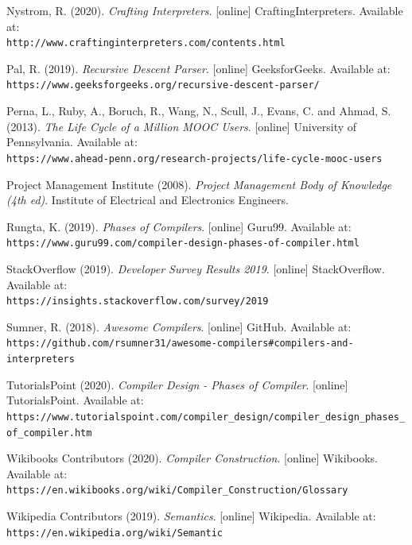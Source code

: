\documentclass[
]{report}
\begin{document}
\begin{thebibliography}{24}
	Nystrom, R. (2020).
	\textit{Crafting Interpreters}.
	[online] CraftingInterpreters. Available at:
	\\\texttt{http://www.craftinginterpreters.com/contents.html}
	
	Pal, R. (2019).
	\textit{Recursive Descent Parser}.
	[online] GeeksforGeeks. Available at:
	\\\texttt{https://www.geeksforgeeks.org/recursive-descent-parser/}
	
	Perna, L., Ruby, A., Boruch, R., Wang, N., Scull, J., Evans, C. and Ahmad, S. (2013).
	\textit{The Life Cycle of a Million MOOC Users}.
	[online] University of Pennsylvania. Available at:
	\\\texttt{https://www.ahead-penn.org/research-projects/life-cycle-mooc-users}
	
	Project Management Institute (2008).
	\textit{Project Management Body of Knowledge (4th ed)}.
	Institute of Electrical and Electronics Engineers.
	
	Rungta, K. (2019).
	\textit{Phases of Compilers}.
	[online] Guru99. Available at:
	\\\texttt{https://www.guru99.com/compiler-design-phases-of-compiler.html}
	
	StackOverflow (2019).
	\textit{Developer Survey Results 2019}.
	[online] StackOverflow. Available at:
	\\\texttt{https://insights.stackoverflow.com/survey/2019}
	
	Sumner, R. (2018).
	\textit{Awesome Compilers}.
	[online] GitHub. Available at:
	\\\texttt{https://github.com/rsumner31/awesome-compilers\#compilers-and-interpreters}
	
	TutorialsPoint (2020).
	\textit{Compiler Design - Phases of Compiler}.
	[online] TutorialsPoint. Available at:
	\\\texttt{https://www.tutorialspoint.com/compiler\_design/compiler\_design\_phases\_of\_compiler.htm}
	
	Wikibooks Contributors (2020).
	\textit{Compiler Construction}.
	[online] Wikibooks. Available at:
	\\\texttt{https://en.wikibooks.org/wiki/Compiler\_Construction/Glossary}
	
	Wikipedia Contributors (2019).
	\textit{Semantics}.
	[online] Wikipedia. Available at:
	\\\texttt{https://en.wikipedia.org/wiki/Semantic}
	

\end{thebibliography}
\end{document}
